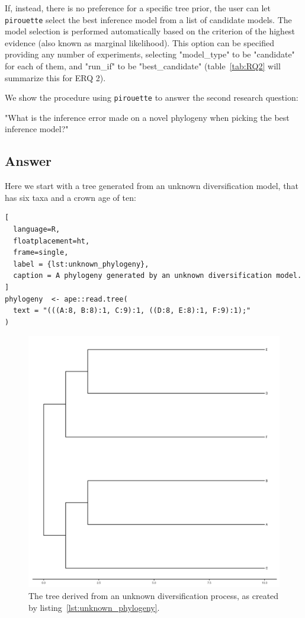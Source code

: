 \documentclass{article}
\begin{document}
If, instead, there is no preference for a specific tree prior, the user can let 
\verb;pirouette; select the best inference model from a list of candidate 
models. The model selection is performed automatically based on the criterion 
of the highest evidence (also known as marginal likelihood). This option can be specified 
providing any number of experiments, selecting "model\_type" to be "candidate" 
for each of them, and "run\_if" to be "best\_candidate" (table~\ref{tab:RQ2} 
will summarize this for ERQ 2).

We show the procedure using \verb;pirouette; to answer the second research 
question:

"What is the inference error made on a novel phylogeny when
picking the best inference model?"

\subsection{Answer}

Here we start with a tree generated from an unknown 
diversification model, that has six taxa and a crown age of ten:

\begin{lstlisting}[
  language=R, 
  floatplacement=ht, 
  frame=single, 
  label = {lst:unknown_phylogeny},
  caption = A phylogeny generated by an unknown diversification model.
]
phylogeny  <- ape::read.tree(
  text = "(((A:8, B:8):1, C:9):1, ((D:8, E:8):1, F:9):1);"
)
\end{lstlisting}
\begin{figure}[ht]
  \includegraphics[width=\textwidth]{example_2/tree_unknown.png}
  \caption{The tree derived from an unknown diversification process, 
    as created by listing~\ref{lst:unknown_phylogeny}.
  }
\end{figure}
\end{document}
